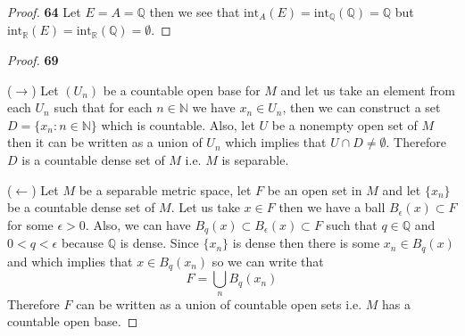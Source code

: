 \documentclass[11pt]{article}
\newcommand{\N}{\mathbb{N}}
\newcommand{\Q}{\mathbb{Q}}
\newcommand{\R}{\mathbb{R}}
\newcommand{\inter}{\text{int}}
\theoremstyle{definition}
\begin{document}
    \begin{proof}{\textbf{64}}
        Let $E = A = \Q$ then we see that $\inter_A(E) = \inter_\Q(\Q) = \Q$ but
        $\inter_\R(E) = \inter_\R(\Q) = \emptyset$.
    \end{proof}
\cleardoublepage
    \begin{proof}{\textbf{69}}

        ($\rightarrow$) Let $(U_n)$ be a countable open base for $M$ and let us
        take an element from each $U_n$ such that for each $n \in \N$ we have
        $x_n \in U_n$, then we can construct a set $D = \{x_n : n \in \N\}$
        which is countable. Also, let $U$ be a nonempty open set of $M$ then
        it can be written as a union of $U_n$ which implies that
        $U \cap D \neq \emptyset$. Therefore $D$ is a countable dense set of $M$
        i.e. $M$ is separable.

        ($\leftarrow$) Let $M$ be a separable metric space, let $F$ be an
        open set in $M$ and let $\{x_n\}$ be a countable dense set of $M$.
        Let us take $x \in F$ then we have a ball
        $B_\epsilon(x) \subset F$ for some $\epsilon > 0$.
        Also, we can have $B_q(x) \subset B_\epsilon(x) \subset F$ such that
        $q \in \Q$ and $0 < q < \epsilon$ because $\Q$ is dense.
        Since $\{x_n\}$ is dense then there is some $x_n \in B_q(x)$
        and which implies that $x \in B_q(x_n)$ so we can write that
        $$F = \bigcup_n B_q(x_n)$$
        Therefore $F$ can be written as a union of countable open sets i.e. $M$
        has a countable open base. 
    \end{proof}
\end{document}
